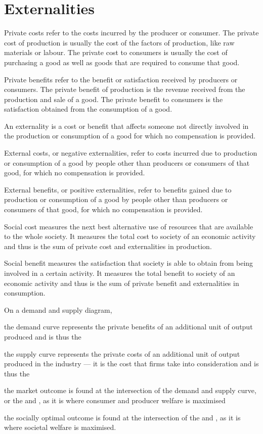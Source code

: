 \documentclass[Economics.tex]{subfiles}
\begin{document}
\section{Externalities}
Private costs refer to the costs incurred by the producer or consumer. The private cost of production is usually the cost of the factors of production, like raw materials or labour. The private cost to consumers is usually the cost of purchasing a good as well as goods that are required to consume that good.

Private benefits refer to the benefit or satisfaction received by producers or consumers. The private benefit of production is the revenue received from the production and sale of a good. The private benefit to consumers is the satisfaction obtained from the consumption of a good.

An externality is a cost or benefit that affects someone not directly involved in the production or consumption of a good for which no compensation is provided.

External costs, or negative externalities, refer to costs incurred due to production or consumption of a good by people other than producers or consumers of that good, for which no compensation is provided.

External benefits, or positive externalities, refer to benefits gained due to production or consumption of a good by people other than producers or consumers of that good, for which no compensation is provided.

Social cost measures the next best alternative use of resources that are available to the whole society. It measures the total cost to society of an economic activity and thus is the sum of private cost and externalities in production.

Social benefit measures the satisfaction that society is able to obtain from being involved in a certain activity. It measures the total benefit to society of an economic activity and thus is the sum of private benefit and externalities in consumption.

On a demand and supply diagram,
\begin{slinenum}
\item the demand curve represents the private benefits of an additional unit of output produced and is thus the 
\item the supply curve represents the private costs of an additional unit of output produced in the industry --- it is the cost that firms take into consideration and is thus the 
\item the market outcome is found at the intersection of the demand and supply curve, or the  and , as it is where consumer and producer welfare is maximised
\item the socially optimal outcome is found at the intersection of the  and , as it is where societal welfare is maximised.
\end{slinenum}
\end{document}
